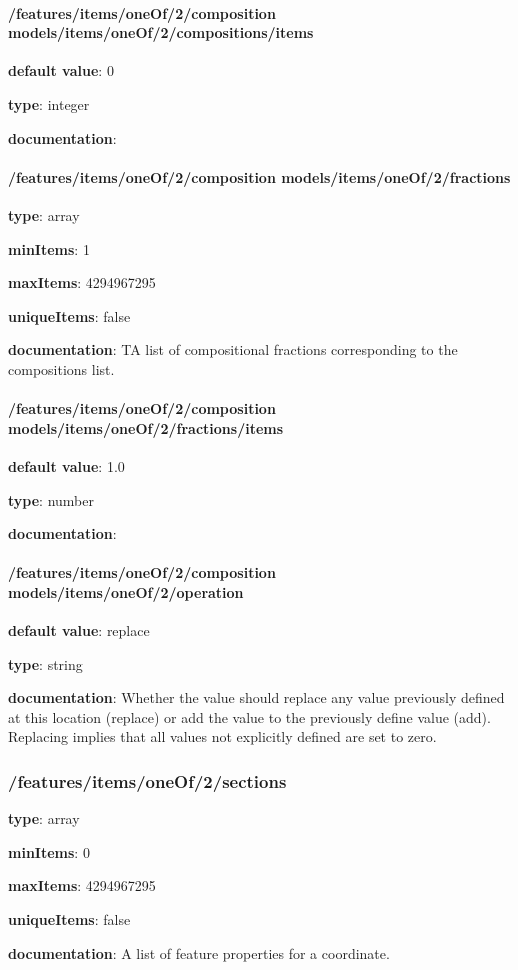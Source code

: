 \begin{itemized}
\paragraph{/features/items/oneOf/2/composition models/items/oneOf/2/compositions/items} \begin{itemized}
\item {\bf default value}: 0
\item {\bf type}: integer
\item {\bf documentation}: 
\end{itemized}\end{itemized}\paragraph{/features/items/oneOf/2/composition models/items/oneOf/2/fractions} \begin{itemized}
\item {\bf type}: array
\item {\bf minItems}: 1
\item {\bf maxItems}: 4294967295
\item {\bf uniqueItems}: false
\item {\bf documentation}: TA list of compositional fractions corresponding to the compositions list.
\paragraph{/features/items/oneOf/2/composition models/items/oneOf/2/fractions/items} \begin{itemized}
\item {\bf default value}: 1.0
\item {\bf type}: number
\item {\bf documentation}: 
\end{itemized}\end{itemized}\paragraph{/features/items/oneOf/2/composition models/items/oneOf/2/operation} \begin{itemized}
\item {\bf default value}: replace
\item {\bf type}: string
\item {\bf documentation}: Whether the value should replace any value previously defined at this location (replace) or add the value to the previously define value (add). Replacing implies that all values not explicitly defined are set to zero.
\end{itemized}\subsubsection{/features/items/oneOf/2/sections} \begin{itemized}
\item {\bf type}: array
\item {\bf minItems}: 0
\item {\bf maxItems}: 4294967295
\item {\bf uniqueItems}: false
\item {\bf documentation}: A list of feature properties for a coordinate.

\end{itemized}
